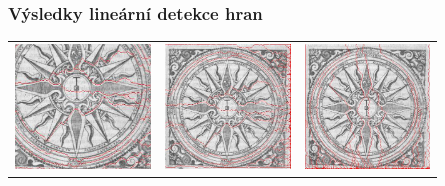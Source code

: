 \documentclass{beamer}
\begin{document}
	\begin{frame}[t,fragile]
		\frametitle{Výsledky lineární detekce hran}	
\begin{center}


		\begin{tabular}{lll}
			\includegraphics[height=33mm]{300p-res.jpg} &		
			\includegraphics[height=33mm]{res-left-right.jpg} &
			\includegraphics[height=33mm]{res-top-bottom.jpg}
		\end{tabular}		
	\end{center}	
	
		
		
	\end{frame}
	
\end{document}
